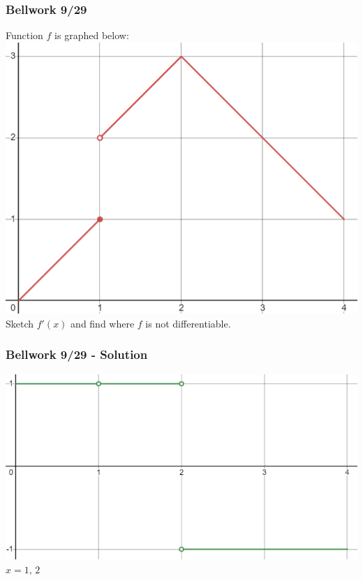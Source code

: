\documentclass[12pt]{beamer}
\begin{document}
\begin{frame}
	\frametitle{Bellwork 9/29}
	\initclock

	\begin{center}
		\vfill
		Function $f$ is graphed below:
		\vfill
		\includegraphics[scale=0.5]{exercise_1_graph.png}
		\vfill
		Sketch $f'(x)$ and find where $f$ is not differentiable.
		\vfill
	\end{center}

	\small
	\crono
\end{frame}
\begin{frame}
	\frametitle{Bellwork 9/29 - Solution}

	\begin{center}
		\includegraphics[scale=0.6]{exercise_1_solution_graph.png}
		\vfill
		$\boxed{x=1\text{, }2}$
	\end{center}
\end{frame}
\end{document}
